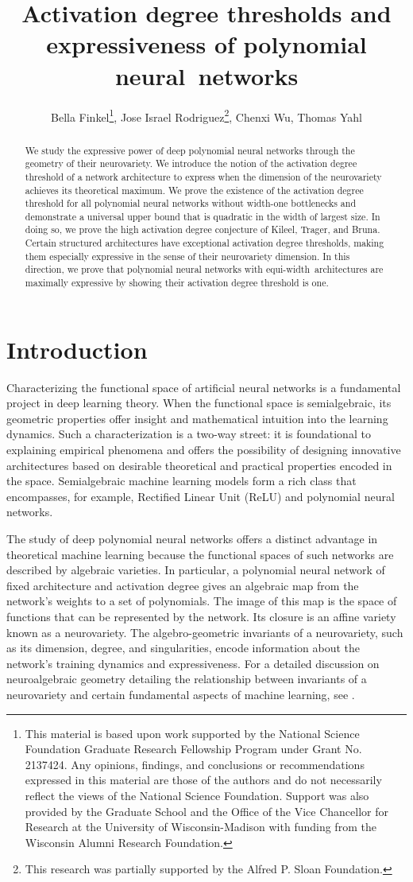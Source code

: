 \documentclass[12pt]{article}
\title{Activation degree thresholds and expressiveness of polynomial neural~networks}
\author{Bella Finkel\footnote{This material is based
upon work supported by the National Science Foundation Graduate Research Fellowship Program under Grant No.
2137424. Any opinions, findings, and conclusions or recommendations expressed in this material are those of the
authors and do not necessarily reflect the views of the National Science Foundation. Support was also provided by
the Graduate School and the Office of the Vice Chancellor for Research at the University of Wisconsin-Madison
with funding from the Wisconsin Alumni Research Foundation.}, Jose Israel Rodriguez\footnote{This research was partially supported by the Alfred P. Sloan Foundation.}, Chenxi Wu, Thomas Yahl}
\theoremstyle{definition}
\begin{document}
\maketitle

\begin{abstract}
We study the expressive power of deep polynomial neural networks through the geometry of their neurovariety. We introduce the notion of the activation degree threshold of a network architecture to express when the dimension of the neurovariety achieves its theoretical maximum. We prove the existence of the activation degree threshold for all polynomial neural networks without width-one bottlenecks and demonstrate a universal upper bound that is quadratic in the width of largest size. In doing so, we prove the high activation degree conjecture of Kileel, Trager, and Bruna. 
Certain structured architectures have exceptional activation degree thresholds, making them especially expressive in the sense of their neurovariety dimension.
In this direction, we prove that polynomial neural networks with equi-width~architectures are maximally expressive by showing their activation degree threshold is one.
\end{abstract}

\section*{Introduction}

Characterizing the functional space of artificial neural networks is a fundamental project in deep learning theory. When the functional space is semialgebraic, its geometric properties offer insight and mathematical intuition into the learning dynamics. Such a characterization is a two-way street: it is foundational to explaining empirical phenomena and offers the possibility of designing innovative architectures based on desirable theoretical and practical properties encoded in the space. Semialgebraic machine learning models form a rich class that encompasses, for example, Rectified Linear Unit (ReLU) and polynomial neural networks.

The study of deep polynomial neural networks offers a distinct advantage in theoretical machine learning because the functional spaces of such networks are described by algebraic varieties. In particular, a polynomial neural network of fixed architecture and activation degree gives an algebraic map from the network's weights to a set of polynomials. The image of this map is the space of functions that can be represented by the network. Its closure is an affine variety known as a neurovariety. The algebro-geometric invariants of a neurovariety, such as its dimension, degree, and singularities, encode information about the network's training dynamics and expressiveness. For a detailed discussion on neuroalgebraic geometry detailing the relationship between invariants of a neurovariety and certain fundamental aspects of machine learning, see \cite{marchetti2025invitationneuroalgebraicgeometry}. 
\end{document}
